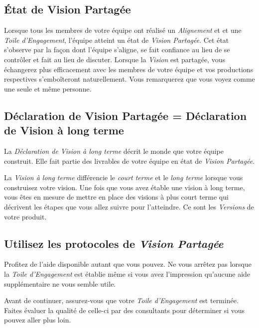 \documentclass[paper=6in:9in,pagesize=pdftex,headinclude=on,footinclude=on,12pt]{scrbook}
\begin{document}
\subsection{État de Vision Partagée}

Lorsque tous les membres de votre équipe ont réalisé un \emph{Alignement} et et une \emph{Toile d'Engagement}, l'équipe atteint un état
de \emph{Vision Partagée}. Cet état s'observe par la façon dont l'équipe s'aligne, se fait confiance au lieu de se contrôler et fait au
lieu de discuter. Lorsque la \emph{Vision} est partagée, vous échangerez plus efficacement avec les membres de votre équipe et vos
productions respectives s'emboîteront naturellement. Vous remarquerez que vous \og{}voyez comme une seule et même personne\fg{}.

\subsection{Déclaration de Vision Partagée = Déclaration de Vision à long terme}

La \emph{Déclaration de Vision à long terme} décrit le monde que votre équipe construit. Elle fait partie des livrables de votre équipe
en état de \emph{Vision Partagée}.

La \emph{Vision à long terme} différencie le \emph{court terme} et le \emph{long terme} lorsque vous construisez votre vision. Une fois
que vous avez étable une vision à long terme, vous êtes en mesure de mettre en place des visions à plus court terme qui décrivent les
étapes que vous allez suivre pour l'atteindre. Ce sont les \emph{Versions} de votre produit.

\subsection{Utilisez les protocoles de \emph{Vision Partagée}}

Profitez de l'aide disponible autant que vous pouvez. Ne vous arrêtez pas lorsque la \emph{Toile d'Engagement} est
établie même si vous avez l'impression qu'aucune aide supplémentaire ne vous semble utile.

Avant de continuer, assurez-vous que votre \emph{Toile d'Engagement} est terminée. Faites évaluer la qualité de celle-ci par des
consultants pour déterminer si vous pouvez aller plus loin.
\end{document}
